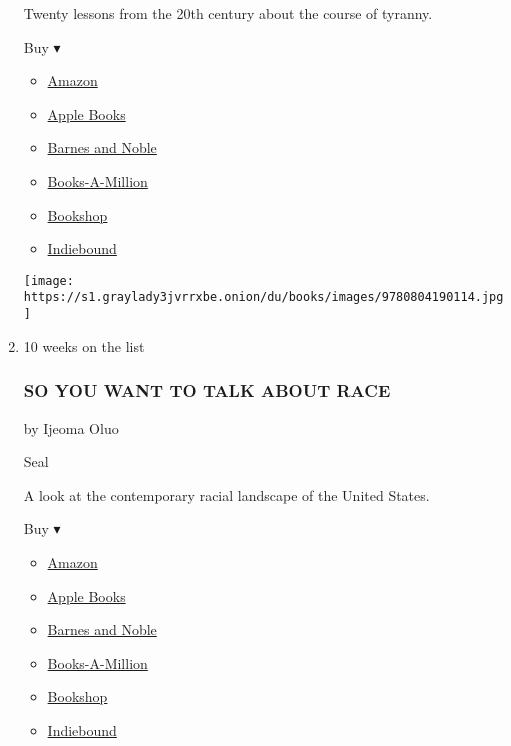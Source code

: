 \begin{enumerate}
  Twenty lessons from the 20th century about the course of tyranny.

  Buy ▾

  \begin{itemize}
  \tightlist
  \item
    \href{https://www.amazon.com/Tyranny-Twenty-Lessons-Twentieth-Century/dp/0804190119?tag=NYTBS-20}{Amazon}
  \item
    \href{https://du-gae-books-dot-nyt-du-prd.appspot.com/buy?title=ON+TYRANNY\&author=Timothy+Snyder}{Apple
    Books}
  \item
    \href{https://www.anrdoezrs.net/click-7990613-11819508?url=https\%3A\%2F\%2Fwww.barnesandnoble.com\%2Fw\%2F\%3Fean\%3D9780804190114}{Barnes
    and Noble}
  \item
    \href{https://www.anrdoezrs.net/click-7990613-35140?url=https\%3A\%2F\%2Fwww.booksamillion.com\%2Fp\%2FON\%2BTYRANNY\%2FTimothy\%2BSnyder\%2F9780804190114}{Books-A-Million}
  \item
    \href{https://bookshop.org/a/3546/9780804190114}{Bookshop}
  \item
    \href{https://www.indiebound.org/book/9780804190114?aff=NYT}{Indiebound}
  \end{itemize}

  \texttt{[image: https://s1.graylady3jvrrxbe.onion/du/books/images/9780804190114.jpg]}
\item
  10 weeks on the list

  \hypertarget{so-you-want-to-talk-about-race}{%
  \subsubsection{SO YOU WANT TO TALK ABOUT
  RACE}\label{so-you-want-to-talk-about-race}}

  by Ijeoma Oluo

  Seal

  A look at the contemporary racial landscape of the United States.

  Buy ▾

  \begin{itemize}
  \tightlist
  \item
    \href{https://www.amazon.com/You-Want-Talk-About-Race-ebook/dp/B073P53DVL?tag=NYTBS-20}{Amazon}
  \item
    \href{https://du-gae-books-dot-nyt-du-prd.appspot.com/buy?title=SO+YOU+WANT+TO+TALK+ABOUT+RACE\&author=Ijeoma+Oluo}{Apple
    Books}
  \item
    \href{https://www.anrdoezrs.net/click-7990613-11819508?url=https\%3A\%2F\%2Fwww.barnesandnoble.com\%2Fw\%2F\%3Fean\%3D9781580058827}{Barnes
    and Noble}
  \item
    \href{https://www.anrdoezrs.net/click-7990613-35140?url=https\%3A\%2F\%2Fwww.booksamillion.com\%2Fp\%2FSO\%2BYOU\%2BWANT\%2BTO\%2BTALK\%2BABOUT\%2BRACE\%2FIjeoma\%2BOluo\%2F9781580058827}{Books-A-Million}
  \item
    \href{https://bookshop.org/a/3546/9781580058827}{Bookshop}
  \item
    \href{https://www.indiebound.org/book/9781580058827?aff=NYT}{Indiebound}
  \end{itemize}


\end{enumerate}
